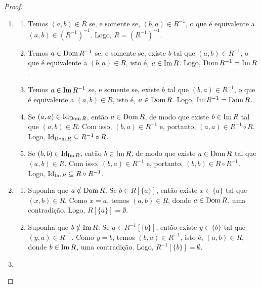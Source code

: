 \begin{proof}
    \leavevmode
        \begin{enumerate}[leftmargin=*, align=left, label=\textbf{(\alph*)}]
            \item 
                \begin{enumerate}[label=\roman*.]
                    \item Temos $(a,b) \in R$ se, e somente se, $(b,a) \in R^{-1}$, o que é equivalente a $(a,b) \in (R^{-1})^{-1}$. Logo, $R = (R^{-1})^{-1}$.
                    \item Temos $a \in \operatorname{Dom} R^{-1}$ se, e somente se, existe $b$ tal que $(a,b) \in R^{-1}$, o que é equivalente a $(b,a) \in R$, isto é, $a \in \operatorname{Im} R$. Logo, $\operatorname{Dom} R^{-1} = \operatorname{Im} R$.
                    \item Temos $a \in \operatorname{Im} R^{-1}$ se, e somente se, existe $b$ tal que $(b,a) \in R^{-1}$, o que é equivalente a $(a,b) \in R$, isto é, $a \in \operatorname{Dom} R$. Logo, $\operatorname{Im} R^{-1} = \operatorname{Dom} R$.
                    \item Se $(a,a) \in \operatorname{Id}_{\operatorname{Dom} R}$, então $a \in \operatorname{Dom} R$, de modo que existe $b \in \operatorname{Im} R$ tal que $(a,b) \in R$. Com isso, $(b,a) \in R^{-1}$ e, portanto, $(a,a) \in R^{-1} \circ R$. Logo, $\operatorname{Id}_{\operatorname{Dom} R} \subseteq R^{-1} \circ R$.
                    \item Se $(b,b) \in \operatorname{Id}_{\operatorname{Im} R}$, então $b \in \operatorname{Im} R$, de modo que existe $a \in \operatorname{Dom} R$ tal que $(a,b) \in R$. Com isso, $(b,a) \in R^{-1}$ e, portanto, $(b,b) \in R \circ R^{-1}$. Logo, $\operatorname{Id}_{\operatorname{Im} R} \subseteq R \circ R^{-1}$.
                \end{enumerate}
            \item 
                \begin{enumerate}[label=\roman*.]
                    \item Suponha que $a \notin \operatorname{Dom} R$. Se $b \in R[\{a\}]$, então existe $x \in \{a\}$ tal que $(x,b) \in R$. Como $x = a$, temos $(a,b) \in R$, donde $a \in \operatorname{Dom} R$, uma contradição. Logo, $R[\{a\}] = \emptyset$.
                    \item Suponha que $b \notin \operatorname{Im} R$. Se $a \in R^{-1}[\{b\}]$, então existe $y \in \{b\}$ tal que $(y,a) \in R^{-1}$. Como $y = b$, temos $(b,a) \in R^{-1}$, isto é, $(a,b) \in R$, donde $b \in \operatorname{Im} R$, uma contradição. Logo, $R^{-1}[\{b\}] = \emptyset$.
                \end{enumerate}
            \item 
                \begin{enumerate}[label=\roman*.]

\end{enumerate}
\end{enumerate}
\end{proof}
